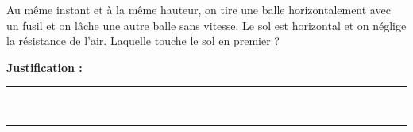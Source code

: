 Au même instant et à la même hauteur, on tire une balle horizontalement avec un fusil et on lâche une autre balle sans vitesse. Le sol est horizontal et on néglige la résistance de l'air. Laquelle touche le sol en premier ?

\choices

\noindent\textbf{Justification :} \hrulefill \\[2.5ex]
\rule{\linewidth}{0.4pt} \\[2.5ex]
\rule{\linewidth}{0.4pt}
\vfill
